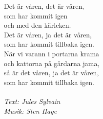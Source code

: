\vspace{10pt}
Det är våren, det är våren,\\
som har kommit igen\\
och med den kärleken.\\
Det är våren, ja det är våren,\\
som har kommit tillbaka igen.\\
När vi varann i portarna krama\\
och kattorna på gårdarna jama,\\
så är det våren, ja det är våren,\\
som har kommit tillbaka igen.\\
\\
{\footnotesize\textit{Text: Jules Sylvain\\ Musik: Sten Hage}}
